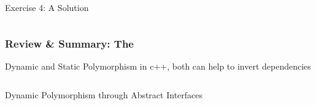 \documentclass[9pt]{beamer}
\begin{document}
\begin{frame}
\begin{exampleblock}{Exercise 4: A Solution}
\begin{columns}[t]
  \end{columns}
  
\end{exampleblock}
\end{frame}

\begin{frame}
  \frametitle{Review \& Summary: The \secname}
\pause
\vfill
\begin{block}{Dynamic and Static Polymorphism}
in c++, both can help to invert dependencies\\
\begin{columns}[t]

    \begin{column}{.45\textwidth}
       \begin{block}{Dynamic Polymorphism through Abstract Interfaces}

          \begin{center}
          \end{center}
       \end{block}
    \end{column}


\end{columns}
\end{block}
\end{frame}
\end{document}
